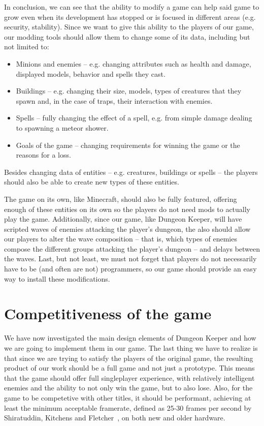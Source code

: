 In conclusion, we can see that the ability to modify a game can help said game to grow even when its development has stopped
or is focused in different areas (e.g. security, stability). Since we want to give this ability to the players of
our game, our modding tools should allow them to change some of its data, including but not limited to:

\begin{itemize}
    \item Minions and enemies -- e.g. changing attributes such as health and damage, displayed models, behavior and spells they
        cast.
    \item Buildings -- e.g. changing their size, models, types of creatures that they spawn and, in the case of traps, their interaction with
        enemies.
    \item Spells -- fully changing the effect of a spell, e.g. from simple damage dealing to spawning a meteor shower.
    \item Goals of the game -- changing requirements for winning the game or the reasons for a loss.
\end{itemize}

Besides changing data of entities -- e.g. creatures, buildings or spells -- the players should also be able to create new types of these
entities.

The game on its own, like Minecraft, should also be fully featured, offering enough of these entities
on its own so the players do not need mods to actually play the game. Additionally, since our game, like Dungeon Keeper,
will have scripted waves of enemies attacking the player's dungeon, the also should allow our players to alter the wave 
composition -- that is, which types of enemies compose the different groups attacking the player's dungeon --  and delays between
the waves. Last, but not least, we must not forget that players do not necessarily have to be (and often are not)
programmers, so our game should provide an easy way to install these modifications.

\section{Competitiveness of the game}

We have now investigated the main design elements of Dungeon Keeper and how we are going 
to implement them in our game. The last thing we have to realize is that since we are trying to satisfy the players of the original
game, the resulting product of our work should be a full game and not just a prototype. This means that the game should offer full 
singleplayer experience, with relatively intelligent enemies and the ability to not only win the game, but to also lose. 
Also, for the game to be competetive with other titles,
it should be performant, achieving at least the minimum acceptable framerate, defined as 25-30 frames per second by 
Shiratuddin, Kitchens and Fletcher~\cite{AcceptableFPS}, on both new and older hardware.

